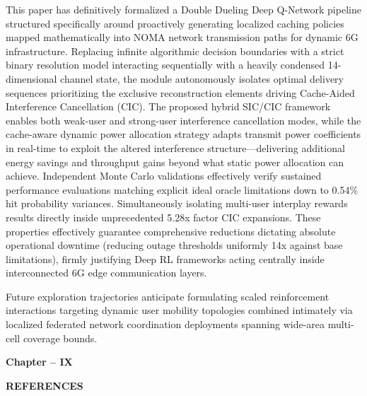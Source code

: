 \documentclass[12pt,a4paper]{article}
\begin{document}
This paper has definitively formalized a Double Dueling Deep Q-Network pipeline structured specifically around proactively generating localized caching policies mapped mathematically into NOMA network transmission paths for dynamic 6G infrastructure. Replacing infinite algorithmic decision boundaries with a strict binary resolution model interacting sequentially with a heavily condensed 14-dimensional channel state, the module autonomously isolates optimal delivery sequences prioritizing the exclusive reconstruction elements driving Cache-Aided Interference Cancellation (CIC). The proposed hybrid SIC/CIC framework enables both weak-user and strong-user interference cancellation modes, while the cache-aware dynamic power allocation strategy adapts transmit power coefficients in real-time to exploit the altered interference structure---delivering additional energy savings and throughput gains beyond what static power allocation can achieve. Independent Monte Carlo validations effectively verify sustained performance evaluations matching explicit ideal oracle limitations down to 0.54\% hit probability variances. Simultaneously isolating multi-user interplay rewards results directly inside unprecedented 5.28x factor CIC expansions. These properties effectively guarantee comprehensive reductions dictating absolute operational downtime (reducing outage thresholds uniformly 14x against base limitations), firmly justifying Deep RL frameworks acting centrally inside interconnected 6G edge communication layers.

Future exploration trajectories anticipate formulating scaled reinforcement interactions targeting dynamic user mobility topologies combined intimately via localized federated network coordination deployments spanning wide-area multi-cell coverage bounds.



\clearpage

\begin{center}
    \vspace*{10cm}
    
    {\fontsize{16}{19.2}\selectfont\bfseries
    Chapter -- IX}
    
    \vspace{1cm}
    
    {\fontsize{16}{19.2}\selectfont\bfseries
    REFERENCES}
    
    \vspace*{\fill}
\end{center}
\end{document}
